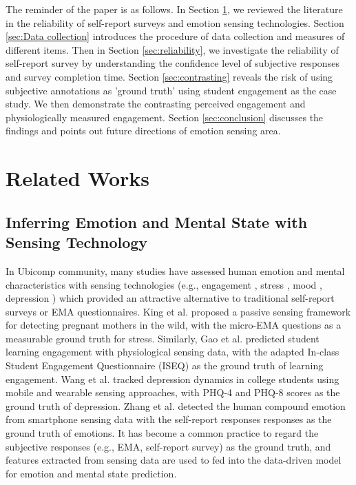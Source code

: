 \documentclass[sigconf]{acmart}
\begin{document}
The reminder of the paper is as follows. In Section \ref{sec:relatedwork}, we reviewed the literature in the reliability of self-report surveys and emotion sensing technologies. Section \ref{sec:Data collection} introduces the procedure of data collection and measures of different items. Then in Section \ref{sec:reliability}, we investigate the reliability of self-report survey by understanding the confidence level of subjective responses and survey completion time. Section \ref{sec:contrasting} reveals the risk of using subjective annotations as 'ground truth' using student engagement as the case study. We then demonstrate the contrasting perceived engagement and physiologically measured engagement. Section \ref{sec:conclusion} discusses the findings and points out future directions of emotion sensing area.

\section{Related Works}
\label{sec:relatedwork}

\subsection{Inferring Emotion and Mental State with Sensing Technology}

In Ubicomp community, many studies have assessed human emotion and mental characteristics with sensing technologies (e.g., engagement \cite{gao2020n,huynh2018engagemon}, stress \cite{king2019microstress}, mood \cite{morshed2019prediction,wang2014studentlife}, depression \cite{bakker2011what,wang2018trackingdepression}) which provided an attractive alternative to traditional self-report surveys or EMA questionnaires.  King et al. \cite{king2019microstress} proposed a passive sensing framework for detecting pregnant mothers in the wild, with the micro-EMA questions as a measurable ground truth for stress. Similarly, Gao et al. \cite{gao2020n} predicted student learning engagement with physiological sensing data, with the adapted In-class Student Engagement Questionnaire (ISEQ) \cite{fuller2018development} as the ground truth of learning engagement. Wang et al. \cite{wang2018trackingdepression} tracked depression dynamics in college students using  mobile and wearable sensing approaches, with PHQ-4 \cite{kroenke2009phq4} and PHQ-8 \cite{kroenke2009phq8} scores as the ground truth of depression. Zhang et al. \cite{Moodexplorer} detected the human compound emotion from smartphone sensing data with the self-report responses responses as the ground truth of emotions. It has become a common practice to regard the subjective responses (e.g., EMA, self-report survey) as the ground truth, and features extracted from sensing data are used to fed into the data-driven model for emotion and mental state prediction.
\end{document}
